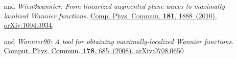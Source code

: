 \begin{thebibliography}{88}
  and 
  \textit{Wien2wannier: From linearized augmented plane waves to maximally
    localized Wannier functions.}
  \href{http://www.sciencedirect.com/science/article/pii/S0010465510002948}{
    Comp. Phys. Commun. \textbf{181}, 1888~(2010),
  }
  \href{http://arxiv.org/abs/1004.3934}{arXiv:1004.3934}.

  and 
  \textit{Wannier90: A tool for obtaining maximally-localized Wannier
    functions.}
  \href{http://www.sciencedirect.com/science/article/pii/S0010465507004936}{%
    Comput. Phys. Commun. \textbf{178}, 685~(2008).
  }
  \href{http://arxiv.org/abs/0708.0650}{arXiv:0708.0650}


\end{thebibliography}


